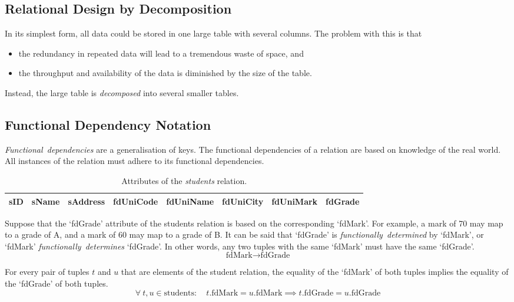 \subsection{Relational Design by Decomposition}

In its simplest form, all data could be stored in one large table with several columns.
The problem with this is that
\begin{itemize}
  \item the redundancy in repeated data will lead to a tremendous waste of space, and
  \item the throughput and availability of the data is diminished by the size of the table.
\end{itemize}

Instead, the large table is \emph{decomposed} into several smaller tables.

\subsection{Functional Dependency Notation}

\emph{Functional~dependencies} are a generalisation of keys.
The functional dependencies of a relation are based on knowledge of the real world.
All instances of the relation must adhere to its functional dependencies.

\begin{table}[htp]
  \centering
  \caption*{Attributes of the \emph{students} relation.}
  \begin{tabular}{llllllll}
    \toprule
    sID & sName & sAddress & fdUniCode & fdUniName & fdUniCity & fdUniMark & fdGrade \\
    \bottomrule
  \end{tabular}
\end{table}

Suppose that the `fdGrade' attribute of the students relation is based on the corresponding `fdMark'.
For example, a mark of 70 may map to a grade of A, and a mark of 60 may map to a grade of B\@.
It can be said that `fdGrade' is \emph{functionally~determined} by `fdMark', or `fdMark' \emph{functionally~determines} `fdGrade'.
In other words, any two tuples with the same `fdMark' must have the same `fdGrade'.
\begin{equation*}
  \text{fdMark} \rightarrow \text{fdGrade}
\end{equation*}

For every pair of tuples \( t \) and \( u \) that are elements of the student relation, the equality of the `fdMark' of both tuples implies the equality of the `fdGrade' of both tuples.
\begin{equation*}
  \forall\ t,u \in \text{students}: \quad t.\text{fdMark} = u.\text{fdMark} \implies t.\text{fdGrade} = u.\text{fdGrade}
\end{equation*}

